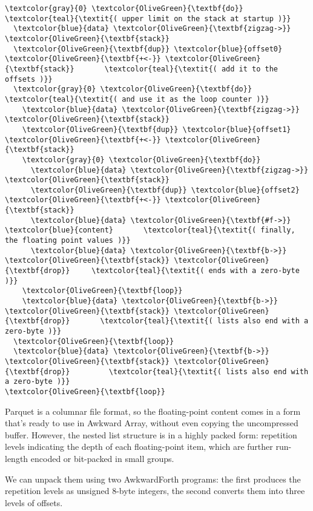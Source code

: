 \documentclass{webofc}
\begin{document}
\begin{Verbatim}[commandchars=\\\{\}]
\textcolor{gray}{0} \textcolor{OliveGreen}{\textbf{do}}                          \textcolor{teal}{\textit{( upper limit on the stack at startup )}}
  \textcolor{blue}{data} \textcolor{OliveGreen}{\textbf{zigzag->}} \textcolor{OliveGreen}{\textbf{stack}}
  \textcolor{OliveGreen}{\textbf{dup}} \textcolor{blue}{offset0} \textcolor{OliveGreen}{\textbf{+<-}} \textcolor{OliveGreen}{\textbf{stack}}       \textcolor{teal}{\textit{( add it to the offsets )}}
  \textcolor{gray}{0} \textcolor{OliveGreen}{\textbf{do}}                        \textcolor{teal}{\textit{( and use it as the loop counter )}}
    \textcolor{blue}{data} \textcolor{OliveGreen}{\textbf{zigzag->}} \textcolor{OliveGreen}{\textbf{stack}}
    \textcolor{OliveGreen}{\textbf{dup}} \textcolor{blue}{offset1} \textcolor{OliveGreen}{\textbf{+<-}} \textcolor{OliveGreen}{\textbf{stack}}
    \textcolor{gray}{0} \textcolor{OliveGreen}{\textbf{do}}
      \textcolor{blue}{data} \textcolor{OliveGreen}{\textbf{zigzag->}} \textcolor{OliveGreen}{\textbf{stack}}
      \textcolor{OliveGreen}{\textbf{dup}} \textcolor{blue}{offset2} \textcolor{OliveGreen}{\textbf{+<-}} \textcolor{OliveGreen}{\textbf{stack}}
      \textcolor{blue}{data} \textcolor{OliveGreen}{\textbf{#f->}} \textcolor{blue}{content}       \textcolor{teal}{\textit{( finally, the floating point values )}}
      \textcolor{blue}{data} \textcolor{OliveGreen}{\textbf{b->}} \textcolor{OliveGreen}{\textbf{stack}} \textcolor{OliveGreen}{\textbf{drop}}     \textcolor{teal}{\textit{( ends with a zero-byte )}}
    \textcolor{OliveGreen}{\textbf{loop}}
    \textcolor{blue}{data} \textcolor{OliveGreen}{\textbf{b->}} \textcolor{OliveGreen}{\textbf{stack}} \textcolor{OliveGreen}{\textbf{drop}}       \textcolor{teal}{\textit{( lists also end with a zero-byte )}}
  \textcolor{OliveGreen}{\textbf{loop}}
  \textcolor{blue}{data} \textcolor{OliveGreen}{\textbf{b->}} \textcolor{OliveGreen}{\textbf{stack}} \textcolor{OliveGreen}{\textbf{drop}}         \textcolor{teal}{\textit{( lists also end with a zero-byte )}}
\textcolor{OliveGreen}{\textbf{loop}}
\end{Verbatim}

\noindent Parquet is a columnar file format, so the floating-point content comes in a form that's ready to use in Awkward Array, without even copying the uncompressed buffer. However, the nested list structure is in a highly packed form: repetition levels indicating the depth of each floating-point item, which are further run-length encoded or bit-packed in small groups.

We can unpack them using two AwkwardForth programs: the first produces the repetition levels as unsigned 8-byte integers, the second converts them into three levels of offsets.
\end{document}
